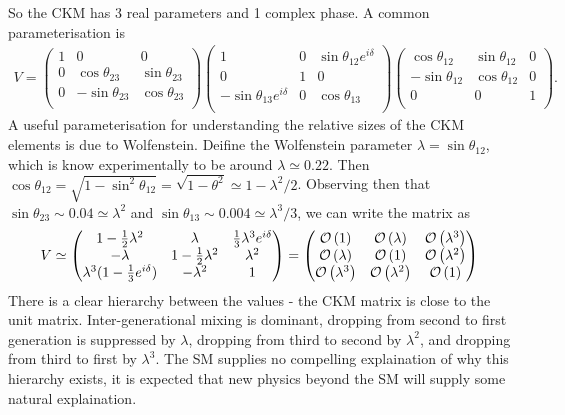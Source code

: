 So the CKM has 3 real parameters and 1 complex phase. A common parameterisation is
\begin{align}
  V =
  \begin{pmatrix}
    1 & 0 & 0 \\
    0 & \cos\theta_{23} & \sin\theta_{23} \\
    0 & -\sin\theta_{23} & \cos\theta_{23} \\
  \end{pmatrix}
  \begin{pmatrix}
    1 & 0 & \sin\theta_{12}e^{i\delta} \\
    0 & 1 & 0  \\
    -\sin\theta_{13} e^{i\delta} & 0 & \cos\theta_{13} \\
  \end{pmatrix}
  \begin{pmatrix}
    \cos\theta_{12} & \sin\theta_{12} & 0  \\
    -\sin\theta_{12} & \cos\theta_{12} & 0 \\
    0 & 0 & 1 \\
  \end{pmatrix}.
\end{align}
A useful parameterisation for understanding the relative sizes of the CKM elements is due to Wolfenstein. Deifine the Wolfenstein parameter $\lambda = \sin\theta_{12}$, which is know experimentally to be around $\lambda\simeq 0.22$. Then $\cos\theta_{12} = \sqrt{1-\sin^2\theta_{12}} = \sqrt{1-\theta^2} \simeq 1 - \lambda^2/2$. Observing then that $\sin\theta_{23} \sim 0.04 \simeq \lambda^2$ and $\sin\theta_{13} \sim 0.004 \simeq \lambda^3/3$, we can write the matrix as
\begin{align}
  V \simeq
  \begin{pmatrix}
    1 - {1\over 2}\lambda^2 & \lambda & {1\over 3} \lambda^3 e^{i\delta}  \\
    - \lambda & 1 - {1\over 2}\lambda^2 & \lambda^2 \\
    \lambda^3(1-{1\over3} e^{i\delta}) & -\lambda^2 & 1 \\
  \end{pmatrix}
  =
    \begin{pmatrix}
    \mathcal{O}\left( 1 \right) & \mathcal{O}\left( \lambda \right) & \mathcal{O}\left( \lambda^3 \right)  \\
    \mathcal{O}\left( \lambda \right) & \mathcal{O}\left( 1 \right) & \mathcal{O}\left( \lambda^2 \right) \\
    \mathcal{O}\left( \lambda^3 \right) & \mathcal{O}\left( \lambda^2 \right) & \mathcal{O}\left( 1 \right) \\
  \end{pmatrix}
\end{align}
There is a clear hierarchy between the values - the CKM matrix is close to the unit matrix. Inter-generational mixing is dominant, dropping from second to first generation is suppressed by $\lambda$, dropping from third to second by $\lambda^2$, and dropping from third to first by $\lambda^3$. The SM supplies no compelling explaination of why this hierarchy exists, it is expected that new physics beyond the SM will supply some natural explaination.

